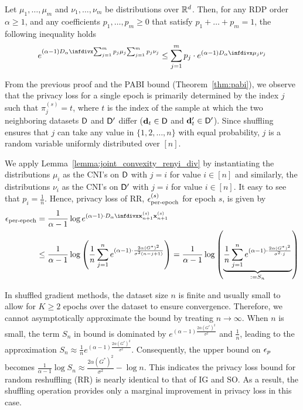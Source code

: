 \begin{lemma}
\label{lemma:joint_convexity_renyi_div}
    Let $\mu_1, \dots, \mu_m$ and $\nu_1, \dots, \nu_m$ be distributions over $\mathbb{R}^d$. Then, for any RDP order $\alpha \geq 1$, and any coefficients $p_1, \dots, p_m \geq 0$ that satisfy $p_1 + \dots + p_m = 1$, the following inequality holds
    \begin{align}
        e^{(\alpha-1) \infdivalpha{\sum_{j=1}^{m} p_j \mu_j}{\sum_{j=1}^{m} p_j \nu_j} }
        \leq \sum_{j=1}^{m} p_j \cdot e^{(\alpha-1) \infdivalpha{\mu_j}{\nu_j} }
    \end{align}
\end{lemma}

From the previous proof and the PABI bound (Theorem~\ref{thm:pabi}), we observe that the privacy loss for a single epoch is primarily determined by the index $j$ such that $\pi_j^{(s)} = t$, where $t$ is the index of the sample at which the two neighboring datasets
${\mathsf{D}}$ and ${\mathsf{D}}'$ differ (${\mathbf{d}}_t \in {\mathsf{D}}$ and ${\mathbf{d}}_{t}' \in {\mathsf{D}}'$).
Since shuffling ensures that $j$ can take any value in $\{1,2,\dots, n\}$ with equal probability, $j$ is a random variable uniformly distributed over $[n]$.

We apply Lemma~\ref{lemma:joint_convexity_renyi_div} by instantiating the distributions $\mu_i$ as the CNI's on ${\mathsf{D}}$ with $j = i$ for value $i\in [n]$ and similarly, the distributions $\nu_i$ as the CNI's on ${\mathsf{D}}'$ with $j = i$ for value $i\in [n]$. It easy to see that $p_i = \frac{1}{n}$. Hence, privacy loss of RR, ${\epsilon}_{\text{per-epoch}}^{(s)}$ for epoch $s$, is given by
\begin{align}
    \eps_{\text{per-epoch}} &= \frac{1}{\alpha-1} \log e^{(\alpha-1) \cdot \infdivalpha{\rvx_{n+1}^{(s)}}{\rvx_{n+1}^{(s)}}}\\
    &\leq \frac{1}{\alpha-1} \log \left(
        \frac{1}{n}\sum_{j=1}^{n} e^{(\alpha-1)\cdot \frac{2\alpha (G^{*})^2}{\sigma^2 (n-j+1)}}
    \right)
    = \frac{1}{\alpha -1}\log \left(
        \underbrace{ \frac{1}{n}\sum_{j=1}^{n} e^{(\alpha-1) \cdot \frac{2\alpha(G^*)^2}{\sigma^2\cdot j}}
        }_{:=S_n}
    \right)
\end{align}

In shuffled gradient methods, the dataset size $n$ is finite and usually small to allow for $K \geq 2$ epochs over the dataset to ensure convergence. Therefore, we cannot asymptotically approximate the bound by treating $n\rightarrow \infty$. 
When $n$ is small, the term $S_n$ in bound is dominated by $e^{(\alpha-1) \frac{2\alpha(G^*)^2}{\sigma^2}}$ and $\frac{1}{n}$,
leading to the approximation
$S_n \approx \frac{1}{n}e^{(\alpha-1) \frac{2\alpha (G^*)^2}{\sigma^2}}$.
Consequently, the upper bound on ${\epsilon}_p$ becomes $\frac{1}{\alpha - 1}\log S_n \approx \frac{2\alpha (G^*)^2}{\sigma^2} - \log n$.
This indicates the privacy loss bound for random reshuffling (RR) is nearly identical to that of IG and SO. As a result, the shuffling operation provides only a marginal improvement in privacy loss in this case.

